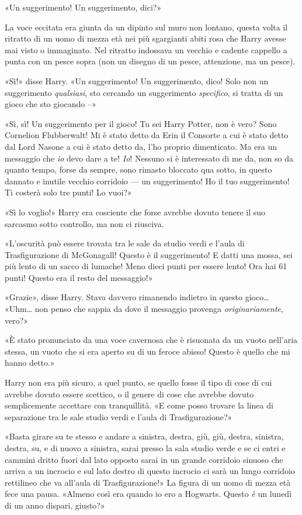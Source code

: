 «Un suggerimento! Un suggerimento, dici?»

La voce eccitata era giunta da un dipinto sul muro non lontano, questa volta il ritratto di un uomo di mezza età nei più sgargianti abiti rosa che Harry avesse mai visto o immaginato. Nel ritratto indossava un vecchio e cadente cappello a punta con un pesce sopra (non un disegno di un pesce, attenzione, ma un pesce).

«Sì!» disse Harry. «Un suggerimento! Un suggerimento, dico! Solo non un suggerimento \textit{qualsiasi}, sto cercando un suggerimento \textit{specifico}, si tratta di un gioco che sto giocando –»

«Sì, sì! Un suggerimento per il gioco! Tu sei Harry Potter, non è vero? Sono Cornelion Flubberwalt! Mi è stato detto da Erin il Consorte a cui è stato detto dal Lord Nasone a cui è stato detto da, l’ho proprio dimenticato. Ma era un messaggio che \textit{io} devo dare a te! \textit{Io}! Nessuno si è interessato di me da, non so da quanto tempo, forse da sempre, sono rimasto bloccato qua sotto, in questo dannato e inutile vecchio corridoio — un suggerimento! Ho il tuo suggerimento! Ti costerà solo tre punti! Lo vuoi?»

«Sì lo voglio!» Harry era cosciente che forse avrebbe dovuto tenere il suo sarcasmo sotto controllo, ma non ci riusciva.

«L’oscurità può essere trovata tra le sale da studio verdi e l’aula di Trasfigurazione di McGonagall! Questo è il suggerimento! E datti una mossa, sei più lento di un sacco di lumache! Meno dieci punti per essere lento! Ora hai 61 punti! Questo era il resto del messaggio!»

«Grazie», disse Harry. Stava davvero rimanendo indietro in questo gioco… «Uhm… non penso che sappia da dove il messaggio provenga \textit{originariamente}, vero?»

«È stato pronunciato da una voce cavernosa che è risuonata da un vuoto nell’aria stessa, un vuoto che si era aperto su di un feroce abisso! Questo è quello che mi hanno detto.»

Harry non era più sicuro, a quel punto, se quello fosse il tipo di cose di cui avrebbe dovuto essere scettico, o il genere di cose che avrebbe dovuto semplicemente accettare con tranquillità. «E come posso trovare la linea di separazione tra le sale studio verdi e l’aula di Trasfigurazione?»

«Basta girare su te stesso e andare a sinistra, destra, giù, giù, destra, sinistra, destra, su, e di nuovo a sinistra, sarai presso la sala studio verde e se ci entri e cammini dritto fuori dal lato opposto sarai in un grande corridoio sinuoso che arriva a un incrocio e sul lato destro di questo incrocio ci sarà un lungo corridoio rettilineo che va all’aula di Trasfigurazione!» La figura di un uomo di mezza età fece una pausa. «Almeno così era quando io ero a Hogwarts. Questo \textit{è} un lunedì di un anno dispari, giusto?»


